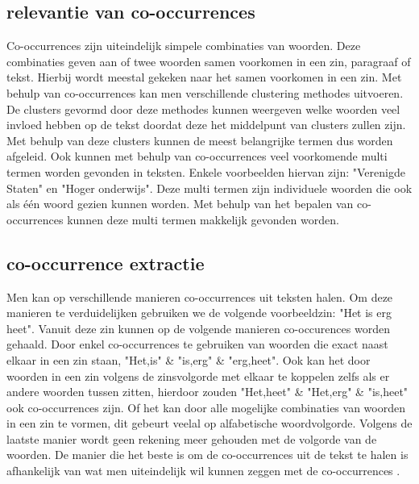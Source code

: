 \subsection{relevantie van co-occurrences}
Co-occurrences zijn uiteindelijk simpele combinaties van woorden. Deze combinaties geven aan of twee woorden samen voorkomen in een zin, paragraaf of tekst. Hierbij wordt meestal gekeken naar het samen voorkomen in een zin. Met behulp van co-occurrences kan men verschillende clustering methodes uitvoeren. De clusters gevormd door deze methodes kunnen weergeven welke woorden veel invloed hebben op de tekst doordat deze het middelpunt van clusters zullen zijn. Met behulp van deze clusters kunnen de meest belangrijke termen dus worden afgeleid. Ook kunnen met behulp van co-occurrences veel voorkomende multi termen worden gevonden in teksten. Enkele voorbeelden hiervan zijn: "Verenigde Staten" en "Hoger onderwijs". Deze multi termen zijn individuele woorden die ook als één woord gezien kunnen worden. Met behulp van het bepalen van co-occurrences kunnen deze multi termen makkelijk gevonden worden. 

\subsection{co-occurrence extractie}
Men kan op verschillende manieren co-occurrences uit teksten halen. Om deze manieren te verduidelijken gebruiken we de volgende voorbeeldzin: "Het is erg heet". Vanuit deze zin kunnen op de volgende manieren co-occurences worden gehaald. Door enkel co-occurrences te gebruiken van woorden die exact naast elkaar in een zin staan, "Het,is" \& "is,erg" \& "erg,heet". Ook kan het door woorden in een zin volgens de zinsvolgorde met elkaar te koppelen zelfs als er andere woorden tussen zitten, hierdoor zouden "Het,heet" \& "Het,erg" \& "is,heet" ook co-occurrences zijn. Of het kan door alle mogelijke combinaties van woorden in een zin te vormen, dit gebeurt veelal op alfabetische woordvolgorde. Volgens de laatste manier wordt geen rekening meer gehouden met de volgorde van de woorden. De manier die het beste is om de co-occurrences uit de tekst te halen is afhankelijk van wat men uiteindelijk wil kunnen zeggen met de co-occurrences \citep{shimohata1997retrieving}.


